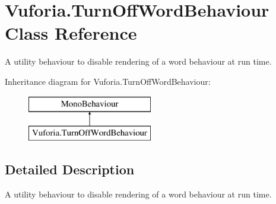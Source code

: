 \hypertarget{class_vuforia_1_1_turn_off_word_behaviour}{}\section{Vuforia.\+Turn\+Off\+Word\+Behaviour Class Reference}
\label{class_vuforia_1_1_turn_off_word_behaviour}


A utility behaviour to disable rendering of a word behaviour at run time.  


Inheritance diagram for Vuforia.\+Turn\+Off\+Word\+Behaviour\+:\begin{figure}[H]
\begin{center}
\leavevmode
\includegraphics[height=2.000000cm]{class_vuforia_1_1_turn_off_word_behaviour}
\end{center}
\end{figure}


\subsection{Detailed Description}
A utility behaviour to disable rendering of a word behaviour at run time. 

